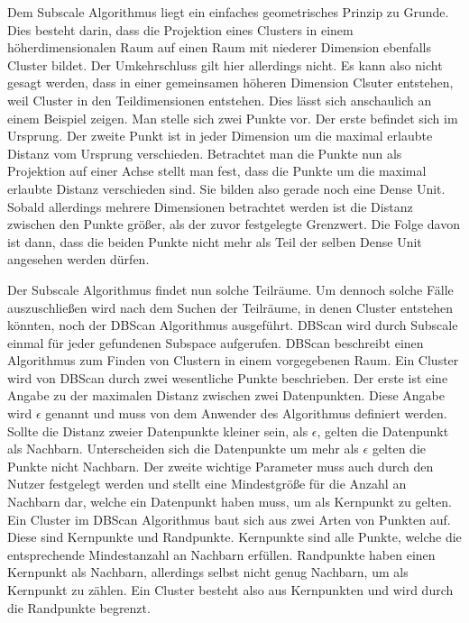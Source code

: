 \documentclass[utf8,biblatex]{lni}
\begin{document}
Dem Subscale Algorithmus liegt ein einfaches geometrisches Prinzip zu Grunde. 
Dies besteht darin, dass die Projektion eines Clusters in einem höherdimensionalen Raum auf einen Raum mit niederer Dimension ebenfalls Cluster bildet. 
Der Umkehrschluss gilt hier allerdings nicht. 
Es kann also nicht gesagt werden, dass in einer gemeinsamen höheren Dimension Clsuter entstehen, weil Cluster in den Teildimensionen entstehen. 
Dies lässt sich anschaulich an einem Beispiel zeigen.
Man stelle sich zwei Punkte vor. 
Der erste befindet sich im Ursprung. 
Der zweite Punkt ist in jeder Dimension um die maximal erlaubte Distanz vom Ursprung verschieden. 
Betrachtet man die Punkte nun als Projektion auf einer Achse stellt man fest, dass die Punkte um die maximal erlaubte Distanz verschieden sind. 
Sie bilden also gerade noch eine Dense Unit. 
Sobald allerdings mehrere Dimensionen betrachtet werden ist die Distanz zwischen den Punkte größer, als der zuvor festgelegte Grenzwert. 
Die Folge davon ist dann, dass die beiden Punkte nicht mehr als Teil der selben Dense Unit angesehen werden dürfen. 

Der Subscale Algorithmus findet nun solche Teilräume. 
Um dennoch solche Fälle auszuschließen wird nach dem Suchen der Teilräume, in denen Cluster entstehen könnten, noch der DBScan Algorithmus ausgeführt. 
DBScan wird durch Subscale einmal für jeder gefundenen Subspace aufgerufen. 
DBScan beschreibt einen Algorithmus zum Finden von Clustern in einem vorgegebenen Raum. 
Ein Cluster wird von DBScan durch zwei wesentliche Punkte beschrieben. 
Der erste ist eine Angabe zu der maximalen Distanz zwischen zwei Datenpunkten. 
Diese Angabe wird $\epsilon$ genannt und muss von dem Anwender des Algorithmus definiert werden. 
Sollte die Distanz zweier Datenpunkte kleiner sein, als $\epsilon$, gelten die Datenpunkt als Nachbarn. 
Unterscheiden sich die Datenpunkte um mehr als $\epsilon$ gelten die Punkte nicht Nachbarn. 
Der zweite wichtige Parameter muss auch durch den Nutzer festgelegt werden und stellt eine Mindestgröße für die Anzahl an Nachbarn dar, welche ein Datenpunkt haben muss, um als Kernpunkt zu gelten. 
Ein Cluster im DBScan Algorithmus baut sich aus zwei Arten von Punkten auf. 
Diese sind Kernpunkte und Randpunkte. 
Kernpunkte sind alle Punkte, welche die entsprechende Mindestanzahl an Nachbarn erfüllen. 
Randpunkte haben einen Kernpunkt als Nachbarn, allerdings selbst nicht genug Nachbarn, um als Kernpunkt zu zählen. 
Ein Cluster besteht also aus Kernpunkten und wird durch die Randpunkte begrenzt. 
\end{document}

